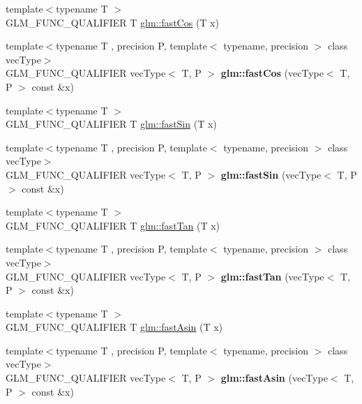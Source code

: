 \begin{DoxyCompactItemize}
\item 
{\footnotesize template$<$typename T $>$ }\\G\-L\-M\-\_\-\-F\-U\-N\-C\-\_\-\-Q\-U\-A\-L\-I\-F\-I\-E\-R T \hyperlink{group__gtx__fast__trigonometry_gab34c8b45c23c0165a64dcecfcc3b302a}{glm\-::fast\-Cos} (T x)
\item 
\hypertarget{namespaceglm_a6a378691e2e5a984d2ad9b256c87961b}{{\footnotesize template$<$typename T , precision P, template$<$ typename, precision $>$ class vec\-Type$>$ }\\G\-L\-M\-\_\-\-F\-U\-N\-C\-\_\-\-Q\-U\-A\-L\-I\-F\-I\-E\-R vec\-Type$<$ T, P $>$ {\bfseries glm\-::fast\-Cos} (vec\-Type$<$ T, P $>$ const \&x)}\label{namespaceglm_a6a378691e2e5a984d2ad9b256c87961b}

\item 
{\footnotesize template$<$typename T $>$ }\\G\-L\-M\-\_\-\-F\-U\-N\-C\-\_\-\-Q\-U\-A\-L\-I\-F\-I\-E\-R T \hyperlink{group__gtx__fast__trigonometry_ga0aab3257bb3b628d10a1e0483e2c6915}{glm\-::fast\-Sin} (T x)
\item 
\hypertarget{namespaceglm_a80a1ff93a0918b400dfb41a7f8842974}{{\footnotesize template$<$typename T , precision P, template$<$ typename, precision $>$ class vec\-Type$>$ }\\G\-L\-M\-\_\-\-F\-U\-N\-C\-\_\-\-Q\-U\-A\-L\-I\-F\-I\-E\-R vec\-Type$<$ T, P $>$ {\bfseries glm\-::fast\-Sin} (vec\-Type$<$ T, P $>$ const \&x)}\label{namespaceglm_a80a1ff93a0918b400dfb41a7f8842974}

\item 
{\footnotesize template$<$typename T $>$ }\\G\-L\-M\-\_\-\-F\-U\-N\-C\-\_\-\-Q\-U\-A\-L\-I\-F\-I\-E\-R T \hyperlink{group__gtx__fast__trigonometry_gaf29b9c1101a10007b4f79ee89df27ba2}{glm\-::fast\-Tan} (T x)
\item 
\hypertarget{namespaceglm_ab443760a1fea463f298e522fd11974dd}{{\footnotesize template$<$typename T , precision P, template$<$ typename, precision $>$ class vec\-Type$>$ }\\G\-L\-M\-\_\-\-F\-U\-N\-C\-\_\-\-Q\-U\-A\-L\-I\-F\-I\-E\-R vec\-Type$<$ T, P $>$ {\bfseries glm\-::fast\-Tan} (vec\-Type$<$ T, P $>$ const \&x)}\label{namespaceglm_ab443760a1fea463f298e522fd11974dd}

\item 
{\footnotesize template$<$typename T $>$ }\\G\-L\-M\-\_\-\-F\-U\-N\-C\-\_\-\-Q\-U\-A\-L\-I\-F\-I\-E\-R T \hyperlink{group__gtx__fast__trigonometry_ga562cb62c51fbfe7fac7db0bce706b81f}{glm\-::fast\-Asin} (T x)
\item 
\hypertarget{namespaceglm_a5421346d5e7544a997ad0c9ec40456f7}{{\footnotesize template$<$typename T , precision P, template$<$ typename, precision $>$ class vec\-Type$>$ }\\G\-L\-M\-\_\-\-F\-U\-N\-C\-\_\-\-Q\-U\-A\-L\-I\-F\-I\-E\-R vec\-Type$<$ T, P $>$ {\bfseries glm\-::fast\-Asin} (vec\-Type$<$ T, P $>$ const \&x)}\label{namespaceglm_a5421346d5e7544a997ad0c9ec40456f7}


\end{DoxyCompactItemize}
